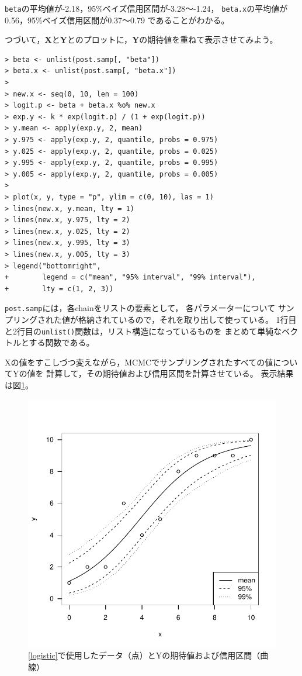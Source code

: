 \documentclass[11pt,uplatex]{jsarticle}
\begin{document}
\noindent
\texttt{beta}の平均値が-2.18，95\%ベイズ信用区間が-3.28〜-1.24，
\texttt{beta.x}の平均値が0.56，95\%ベイズ信用区間が0.37〜0.79
であることがわかる。


つづいて，$\bm{X}$と$\bm{Y}$とのプロットに，$\bm{Y}$の期待値を重ねて表示させてみよう。
\begin{lstlisting}
> beta <- unlist(post.samp[, "beta"])
> beta.x <- unlist(post.samp[, "beta.x"])
> 
> new.x <- seq(0, 10, len = 100)
> logit.p <- beta + beta.x %o% new.x
> exp.y <- k * exp(logit.p) / (1 + exp(logit.p))
> y.mean <- apply(exp.y, 2, mean)
> y.975 <- apply(exp.y, 2, quantile, probs = 0.975)
> y.025 <- apply(exp.y, 2, quantile, probs = 0.025)
> y.995 <- apply(exp.y, 2, quantile, probs = 0.995)
> y.005 <- apply(exp.y, 2, quantile, probs = 0.005)
> 
> plot(x, y, type = "p", ylim = c(0, 10), las = 1)
> lines(new.x, y.mean, lty = 1)
> lines(new.x, y.975, lty = 2)
> lines(new.x, y.025, lty = 2)
> lines(new.x, y.995, lty = 3)
> lines(new.x, y.005, lty = 3)
> legend("bottomright",
+        legend = c("mean", "95% interval", "99% interval"),
+        lty = c(1, 2, 3))
\end{lstlisting}
\noindent
\texttt{post.samp}には，各chainをリストの要素として，
各パラメーターについて
サンプリングされた値が格納されているので，それを取り出して使っている。
1行目と2行目の\texttt{unlist()}関数は，リスト構造になっているものを
まとめて単純なベクトルとする関数である。

Xの値をすこしづつ変えながら，MCMCでサンプリングされたすべての値についてYの値を
計算して，その期待値および信用区間を計算させている。
表示結果は図\ref{example2exp_plot}。
\begin{figure}[htbp]
  \begin{center}
    \includegraphics[bb=0 0 360 360, clip, width=240 bp]{example2_exp.pdf}
  \end{center}
  \caption{\ref{logistic}で使用したデータ（点）とYの期待値および信用区間（曲線）}
  \label{example2exp_plot}
\end{figure}
\end{document}
